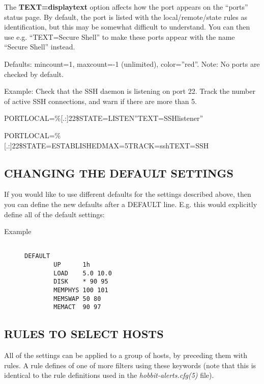   The \textbf{TEXT=displaytext}
 option affects how the port appears on the ``ports'' status page. By default, the port is listed with the local/remote/state rules as identification, but this may be somewhat difficult to understand. You can then use e.g. ``TEXT=Secure Shell'' to make these ports appear with the name ``Secure Shell'' instead. 


  Defaults: mincount=1, maxcount=-1 (unlimited), color=''red''. Note: No ports are checked by default. 


  Example: Check that the SSH daemon is listening on port 22. Track the number of active SSH connections, and warn if there are more than 5.  
 
PORTLOCAL=\%[.:]22\$STATE=LISTEN''TEXT=SSHlistener''  
 
PORTLOCAL=\%[.:]22\$STATE=ESTABLISHEDMAX=5TRACK=sshTEXT=SSH 


 
\subsection{CHANGING THE DEFAULT SETTINGS}
 If you would like to use different defaults for the settings
 described above, then you can define the new defaults after a DEFAULT
 line. E.g. this would explicitly define all of the default settings: 

\begin{description}

\item[Example]

\begin{verbatim}

DEFAULT
        UP      1h
        LOAD    5.0 10.0
        DISK    * 90 95
        MEMPHYS 100 101
        MEMSWAP 50 80
        MEMACT  90 97

\end{verbatim}


\end{description}


 


 
\subsection{RULES TO SELECT HOSTS}
 All of the settings can be applied to a group of hosts, by preceding them with rules. A rule defines of one of more filters using these keywords (note that this is identical to the rule definitions used in the \emph{hobbit-alerts.cfg(5)}
 file). 

